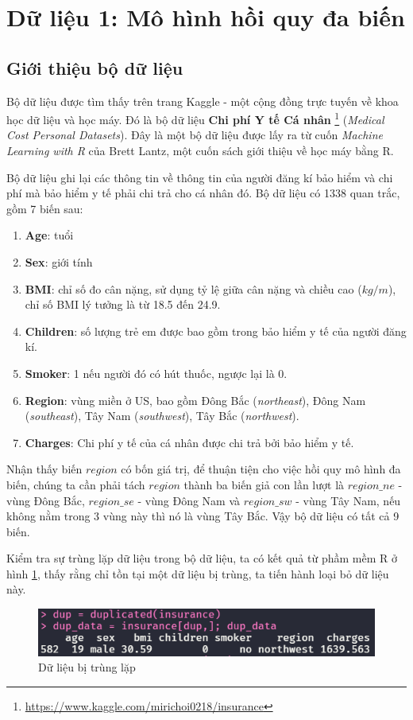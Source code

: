 \section{Dữ liệu 1: Mô hình hồi quy đa biến}

\subsection*{Giới thiệu bộ dữ liệu}
Bộ dữ liệu được tìm thấy trên trang Kaggle - một cộng đồng trực tuyến về khoa học dữ liệu và học máy. Đó là bộ dữ liệu \textbf{Chi phí Y tế Cá nhân} \footnote{\url{https://www.kaggle.com/mirichoi0218/insurance}} (\textit{Medical Cost Personal Datasets}). Đây là một bộ dữ liệu được lấy ra từ cuốn \textit{Machine Learning with R} của Brett Lantz, một cuốn sách giới thiệu về học máy bằng R.

Bộ dữ liệu ghi lại các thông tin về thông tin của người đăng kí bảo hiểm và chi phí mà bảo hiểm y tế phải chi trả cho cá nhân đó. Bộ dữ liệu có 1338 quan trắc, gồm 7 biến sau:
\begin{enumerate}
	\item \textbf{Age}: tuổi
	\item \textbf{Sex}: giới tính
	\item \textbf{BMI}: chỉ số đo cân nặng, sử dụng tỷ lệ giữa cân nặng và chiều cao ($kg / m$), chỉ số BMI lý tưởng là từ 18.5 đến 24.9.
	\item \textbf{Children}: số lượng trẻ em được bao gồm trong bảo hiểm y tế của người đăng kí.	
	\item \textbf{Smoker}: 1 nếu người đó có hút thuốc, ngược lại là 0.
	\item \textbf{Region}: vùng miền ở US, bao gồm Đông Bắc (\textit{northeast}), Đông Nam (\textit{southeast}), Tây Nam (\textit{southwest}), Tây Bắc (\textit{northwest}).
	\item \textbf{Charges}: Chi phí y tế của cá nhân được chi trả bởi bảo hiểm y tế.
\end{enumerate}

Nhận thấy biến $region$ có bốn giá trị, để thuận tiện cho việc hồi quy mô hình đa biến, chúng ta cần phải tách $region$ thành ba biến giả con lần lượt là $region\_ne$ - vùng Đông Bắc, $region\_se$ - vùng Đông Nam và $region\_sw$ - vùng Tây Nam, nếu không nằm trong 3 vùng này thì nó là vùng Tây Bắc. Vậy bộ dữ liệu có tất cả 9 biến.

Kiểm tra sự trùng lặp dữ liệu trong bộ dữ liệu, ta có kết quả từ phầm mềm R ở hình \ref{fig-a1:dataset-duplicated}, thấy rằng chỉ tồn tại một dữ liệu bị trùng, ta tiến hành loại bỏ dữ liệu này.
\begin{figure}[H]
	\centering
	\includegraphics[width=0.7\linewidth]{images/A1/dataset-duplicated}
	\caption{Dữ liệu bị trùng lặp}
	\label{fig-a1:dataset-duplicated}
\end{figure}

